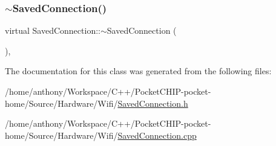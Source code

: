 \mbox{\label{classSavedConnection_adb7138dd927d3bbb7b184b666ef1d50c}} 
\subsubsection{\texorpdfstring{$\sim$\+Saved\+Connection()}{~SavedConnection()}}
{\footnotesize\ttfamily virtual Saved\+Connection\+::$\sim$\+Saved\+Connection (\begin{DoxyParamCaption}{ }\end{DoxyParamCaption})\hspace{0.3cm}{\ttfamily [inline]}, {\ttfamily [virtual]}}



The documentation for this class was generated from the following files\+:\begin{DoxyCompactItemize}
\item 
/home/anthony/\+Workspace/\+C++/\+Pocket\+C\+H\+I\+P-\/pocket-\/home/\+Source/\+Hardware/\+Wifi/\mbox{\hyperlink{SavedConnection_8h}{Saved\+Connection.\+h}}\item 
/home/anthony/\+Workspace/\+C++/\+Pocket\+C\+H\+I\+P-\/pocket-\/home/\+Source/\+Hardware/\+Wifi/\mbox{\hyperlink{SavedConnection_8cpp}{Saved\+Connection.\+cpp}}\end{DoxyCompactItemize}
